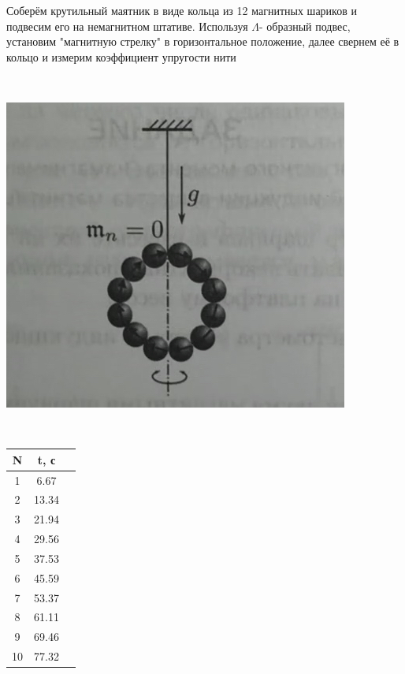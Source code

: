 \documentclass[a4paper,12pt]{article}
\begin{document}
\begin{minipage}{0.3\textwidth}
Соберём крутильный маятник в виде кольца из 12 магнитных шариков и подвесим его на немагнитном штативе. Используя $\Lambda$- образный подвес, установим "магнитную стрелку" в горизонтальное положение, далее свернем её в кольцо и измерим коэффициент упругости нити

\end{minipage}
\begin{minipage}{0.05\textwidth}
\
\end{minipage}
\begin{minipage}{0.3\textwidth}
\begin{center}
\includegraphics[width=\linewidth]{5.jpg}\\
\end{center}

\end{minipage}
\begin{minipage}{0.1\textwidth}
\
\end{minipage}
\begin{minipage}{0.3\textwidth}
\begin{tabular}{|c|c|c|}
		\hline
		N    & t, с  \\
		\hline
1   & 6.67 \\
		\hline
2     &13.34 \\
		\hline
 3     &  21.94 \\
		\hline
4     &  29.56\\
		\hline
 5     & 37.53 \\
		\hline
6     & 45.59 \\
		\hline
7     &  53.37\\
		\hline
8     & 61.11 \\
		\hline
9     &69.46 \\
		\hline
 10   & 77.32 \\
		\hline
	\end{tabular}

\end{minipage}
\\
\end{document}
